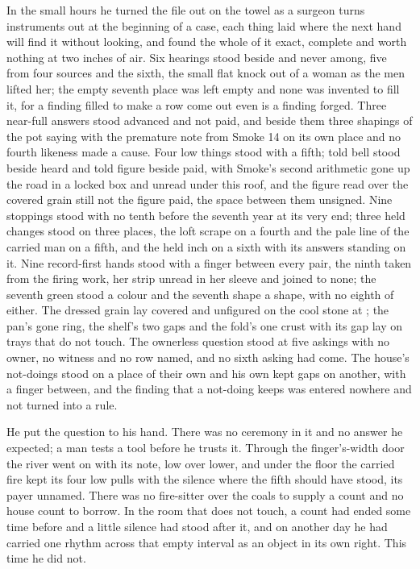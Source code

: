 In the small hours he turned the file out on the towel as a surgeon turns instruments out at the beginning of a case, each thing laid where the next hand will find it without looking, and found the whole of it exact, complete and worth nothing at two inches of air. Six hearings stood beside and never among, five from four sources and the sixth, the small flat knock out of a woman as the men lifted her; the empty seventh place was left empty and none was invented to fill it, for a finding filled to make a row come out even is a finding forged. Three near-full answers stood advanced and not paid, and beside them three shapings of the pot saying with the premature note from Smoke 14 on its own place and no fourth likeness made a cause. Four low things stood with  a fifth; told bell stood beside heard and told figure beside paid, with Smoke's second arithmetic gone up the road in a locked box and unread under this roof, and the figure read over the covered grain still not the figure paid, the space between them unsigned. Nine stoppings stood with no tenth before the seventh year at its very end; three held changes stood on three places, the loft scrape on a fourth and the pale line of the carried man on a fifth, and the held inch on a sixth with its answers standing on it. Nine record-first hands stood with a finger between every pair, the ninth taken from the firing work, her strip unread in her sleeve and joined to none; the seventh green stood a colour and the seventh shape a shape, with no eighth of either. The dressed grain lay covered and unfigured on the cool stone at ; the pan's gone ring, the shelf's two gaps and the fold's one crust with its gap lay on trays that do not touch. The ownerless question stood at five askings with no owner, no witness and no row named, and no sixth asking had come. The house's not-doings stood on a place of their own and his own kept gaps on another, with a finger between, and the finding that a not-doing keeps was entered nowhere and not turned into a rule.

He put the question to his hand. There was no ceremony in it and no answer he expected; a man tests a tool before he trusts it. Through the finger's-width door the river went on with its note, low over lower, and under the floor the carried fire kept its four low pulls with the silence where the fifth should have stood, its payer unnamed. There was no fire-sitter over the coals to supply a count and no house count to borrow. In the room that does not touch, a count had ended some time before and a little silence had stood after it, and on another day he had carried one rhythm across that empty interval as an object in its own right. This time he did not.

